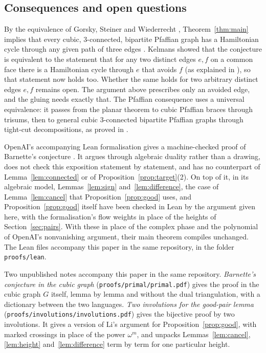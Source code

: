 \documentclass[10pt]{amsart}
\numberwithin{equation}{section}
\theoremstyle{definition}
\theoremstyle{remark}
\begin{document}
\subsection*{Consequences and open questions}
By the equivalence of Gorsky, Steiner and Wiederrecht \cite[Theorem~4.16]{Gorsky2023}, Theorem~\ref{thm:main} implies that every cubic, $3$-connected, bipartite Pfaffian graph has a Hamiltonian cycle through any given path of three edges \cite[Corollary~7.2]{OpenAI2026}.
Kelmans showed that the conjecture is equivalent to the statement that for any two distinct edges $e,f$ on a common face there is a Hamiltonian cycle through $e$ that avoids $f$ (as explained in \cite{Hertel2005,Alt2016}), so that statement now holds too.
Whether the same holds for two arbitrary distinct edges $e,f$ remains open.
The argument above prescribes only an avoided edge, and the gluing needs exactly that.
The Pfaffian consequence uses a universal equivalence: it passes from the planar theorem to cubic Pfaffian braces through trisums, then to general cubic $3$-connected bipartite Pfaffian graphs through tight-cut decompositions, as proved in \cite[Theorem~4.16]{Gorsky2023}.

OpenAI's accompanying Lean formalisation gives a machine-checked proof of Barnette's conjecture \cite{OpenAI2026b}.
It argues through algebraic duality rather than a drawing, does not check this exposition statement by statement, and has no counterpart of Lemma~\ref{lem:connected} or of Proposition~\ref{prop:target}(2).
On top of it, in its algebraic model, Lemmas~\ref{lem:sign} and~\ref{lem:difference}, the case of Lemma~\ref{lem:cancel} that Proposition~\ref{prop:good} uses, and Proposition~\ref{prop:good} itself have been checked in Lean by the argument given here, with the formalisation's flow weights in place of the heights of Section~\ref{sec:pairs}.
With these in place of the complex phase and the polynomial of OpenAI's nonvanishing argument, their main theorem compiles unchanged.
The Lean files accompany this paper in the same repository, in the folder \texttt{proofs/lean}.

Two unpublished notes accompany this paper in the same repository.
\emph{Barnette's conjecture in the cubic graph} (\texttt{proofs/primal/primal.pdf}) gives the proof in the cubic graph $G$ itself, lemma by lemma and without the dual triangulation, with a dictionary between the two languages.
\emph{Two involutions for the good-pair lemma} (\texttt{proofs/involutions/involutions.pdf}) gives the bijective proof by two involutions.
It gives a version of Li's argument \cite{Li2026} for Proposition~\ref{prop:good}, with marked crossings in place of the power $\omega^m$, and unpacks Lemmas~\ref{lem:cancel}, \ref{lem:height} and~\ref{lem:difference} term by term for one particular height.



\end{document}
